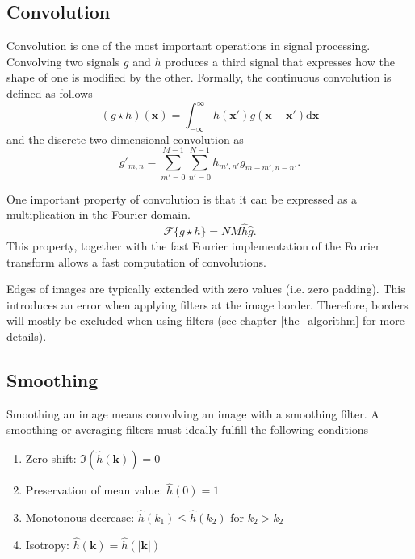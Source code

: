 		\subsection{Convolution}
		Convolution is one of the most important operations in signal processing. Convolving two signals $g$ and $h$ produces a third signal that expresses how the shape of one is modified by the other. Formally, the continuous convolution is defined as follows
		\begin{equation}
			(g \star h)(\mathbf{x}) = \int_{-\infty}^{\infty} 
			h(\mathbf{x}') g(\mathbf{x} - \mathbf{x}')
			\text{d}\mathbf{x}
		\end{equation}
		and the discrete two dimensional convolution as
		\begin{equation}
			g'_{m,n} = \sum_{m'=0}^{M-1} \sum_{n'=0}^{N-1}
			h_{m',n'} g_{m-m', n-n'}.
		\end{equation}
		
		One important property of convolution is that it can be expressed as a multiplication in the Fourier domain. 
		\begin{equation}
		\mathscr{F}\{g \star h\} = N M \hat{h} \hat{g}.
		\end{equation}
		This property, together with the fast Fourier implementation of the Fourier transform allows a fast computation of convolutions. 
		
		Edges of images are typically extended with zero values (i.e. zero padding). This introduces an error when applying filters at the image border. Therefore, borders will mostly be excluded when using filters (see chapter \ref{the_algorithm} for more details).
		
		\subsection{Smoothing}\label{sect:smoothing}
		Smoothing an image means convolving an image with a smoothing filter. A smoothing or averaging filters must ideally fulfill the following conditions
		\begin{enumerate}
			\item Zero-shift: $\Im (\hat{h}(\mathbf{k})) = 0$
			\item Preservation of mean value: $\hat{h}(0) = 1 $
			\item Monotonous decrease: $ \hat{h}(k_1) \leq \hat{h}(k_2) $ for $ k_2 > k_2 $
			\item Isotropy: $\hat{h}(\mathbf{k}) = \hat{h}(| \mathbf{k} |)$
		\end{enumerate}
		
